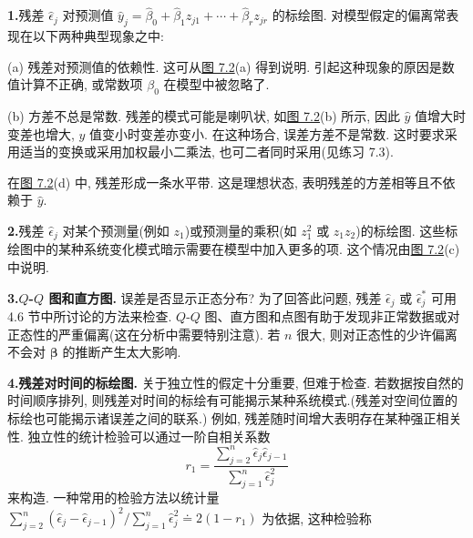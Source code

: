 \noindent\textbf{1.}\quad 残差 $\hat{\epsilon}_j$ 对预测值 $\hat{y}_j=\hat{\beta}_0+\hat{\beta}_1z_{j1}+\cdots+\hat{\beta}_rz_{jr}$ 的标绘图. 对模型假定的偏离常表现在以下两种典型现象之中:

(a) 残差对预测值的依赖性. 这可从\hyperref[fig:7.2]{图 7.2}(a) 得到说明. 引起这种现象的原因是数值计算不正确, 或常数项 $\beta_0$ 在模型中被忽略了.

(b) 方差不总是常数. 残差的模式可能是喇叭状, 如\hyperref[fig:7.2]{图 7.2}(b) 所示, 因此 $\hat{y}$ 值增大时变差也增大, $\hat{y}$ 值变小时变差亦变小. 在这种场合, 误差方差不是常数. 这时要求采用适当的变换或采用加权最小二乘法, 也可二者同时采用(见练习 7.3).

在\hyperref[fig:7.2]{图 7.2}(d) 中, 残差形成一条水平带. 这是理想状态, 表明残差的方差相等且不依赖于 $\hat{y}$.

\noindent\textbf{2.}\quad 残差 $\hat{\epsilon}_j$ 对某个预测量(例如 $z_1$)或预测量的乘积(如 $z_1^2$ 或 $z_1z_2$)的标绘图. 这些标绘图中的某种系统变化模式暗示需要在模型中加入更多的项. 这个情况由\hyperref[fig:7.2]{图 7.2}(c) 中说明.

\noindent\textbf{3.}\quad \textbf{$Q$-$Q$ 图和直方图.} 误差是否显示正态分布? 为了回答此问题, 残差 $\hat{\epsilon}_j$ 或 $\hat{\epsilon}_j^*$ 可用 4.6 节中所讨论的方法来检查. $Q$-$Q$ 图、直方图和点图有助于发现非正常数据或对正态性的严重偏离(这在分析中需要特别注意). 若 $n$ 很大, 则对正态性的少许偏离不会对 $\boldsymbol{\beta}$ 的推断产生太大影响.

\noindent\textbf{4.}\quad \textbf{残差对时间的标绘图.} 关于独立性的假定十分重要, 但难于检查. 若数据按自然的时间顺序排列, 则残差对时间的标绘有可能揭示某种系统模式.(残差对空间位置的标绘也可能揭示诸误差之间的联系.) 例如, 残差随时间增大表明存在某种强正相关性. 独立性的统计检验可以通过一阶自相关系数
\label{eq:7-19}
\begin{equation}
r_1=\frac{\sum\limits_{j=2}^{n}\hat{\epsilon}_j\hat{\epsilon}_{j-1}}{\sum\limits_{j=1}^{n}\hat{\epsilon}_j^2} \tag{7-19}
\end{equation}
来构造. 一种常用的检验方法以统计量 $\sum\limits_{j=2}^{n}(\hat{\epsilon}_j-\hat{\epsilon}_{j-1})^2\Big/\sum\limits_{j=1}^{n}\hat{\epsilon}_j^2\doteq 2(1-r_1)$ 为依据, 这种检验称
